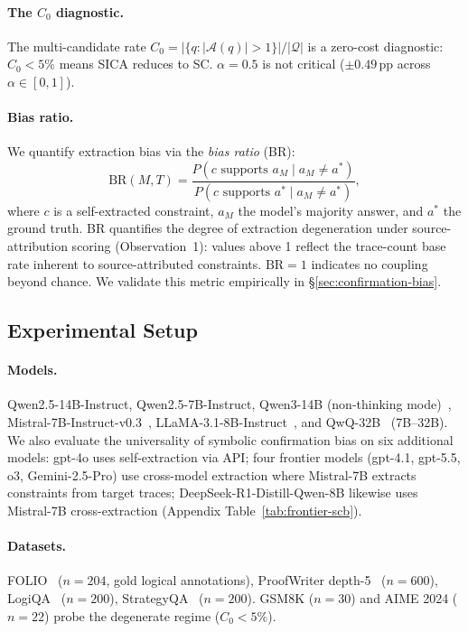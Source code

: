 \paragraph{The $C_0$ diagnostic.} The multi-candidate rate $C_0 = |\{q : |\mathcal{A}(q)| > 1\}| / |\mathcal{Q}|$ is a zero-cost diagnostic: $C_0 < 5\%$ means SICA reduces to SC. $\alpha = 0.5$ is not critical (${\pm}0.49$\,pp across $\alpha \in [0, 1]$).

\paragraph{Bias ratio.} We quantify extraction bias via the \emph{bias ratio} (BR):
\begin{equation}\label{eq:mirage}
\text{BR}(M,T) = \frac{P(c \text{ supports } a_M \mid a_M \neq a^*)}{P(c \text{ supports } a^* \mid a_M \neq a^*)},
\end{equation}
where $c$ is a self-extracted constraint, $a_M$ the model's majority answer, and $a^*$ the ground truth. BR quantifies the degree of extraction degeneration under source-attribution scoring (Observation~1): values above 1 reflect the trace-count base rate inherent to source-attributed constraints. $\text{BR} = 1$ indicates no coupling beyond chance. We validate this metric empirically in \S\ref{sec:confirmation-bias}.

\subsection{Experimental Setup}
\label{sec:exp-setup}

\paragraph{Models.} Qwen2.5-14B-Instruct, Qwen2.5-7B-Instruct, Qwen3-14B (non-thinking mode)~\citep{yang2024qwen25}, Mistral-7B-Instruct-v0.3~\citep{jiang2023mistral}, LLaMA-3.1-8B-Instruct~\citep{dubey2024llama3}, and QwQ-32B~\citep{qwen2024qwq} (7B--32B). We also evaluate the universality of symbolic confirmation bias on six additional models: gpt-4o uses self-extraction via API; four frontier models (gpt-4.1, gpt-5.5, o3, Gemini-2.5-Pro) use cross-model extraction where Mistral-7B extracts constraints from target traces; DeepSeek-R1-Distill-Qwen-8B likewise uses Mistral-7B cross-extraction (Appendix Table~\ref{tab:frontier-scb}).

\paragraph{Datasets.} FOLIO~\citep{han2022folio} ($n{=}204$, gold logical annotations), ProofWriter depth-5~\citep{tafjord2021proofwriter} ($n{=}600$), LogiQA~\citep{liu2020logiqa} ($n{=}200$), StrategyQA~\citep{geva2021strategyqa} ($n{=}200$). GSM8K ($n{=}30$) and AIME 2024 ($n{=}22$) probe the degenerate regime ($C_0 < 5\%$).


